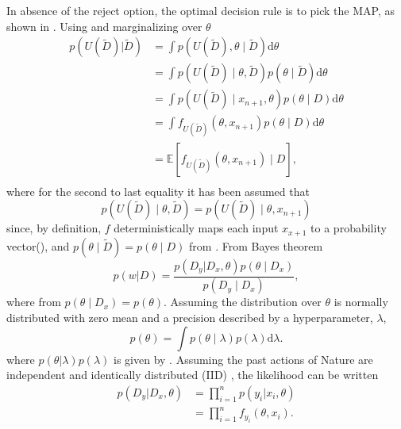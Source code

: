 In absence of the reject option, the optimal decision rule is to pick the MAP, as shown in . Using  and marginalizing over $\theta$
\begin{equation}
	\begin{split}
		p(U(\tilde{D})|\tilde{D}) &= \int p(U(\tilde{D}),\theta \mid\tilde{D}) \mathrm{d}\theta \\
		& = \int p(U(\tilde{D})\mid \theta,\tilde{D})  p(\theta \mid\tilde{D})\mathrm{d}\theta \\
		& = \int p(U(\tilde{D})\mid x_{n+1},\theta)  p(\theta\mid D)\mathrm{d}\theta \\
		& = \int f_{U(\tilde{D})}(\theta,x_{n+1})  p(\theta \mid D)\mathrm{d}\theta \\
		& = \mathbb{E}[f_{U(\tilde{D})}(\theta,x_{n+1})\mid D],\\
	\end{split}
	\label{eq:q5}
\end{equation}
where for the second to last equality it has been assumed that
\begin{equation}
	p(U(\tilde{D})\mid \theta,\tilde{D}) = p(U(\tilde{D})\mid \theta,x_{n+1})
\end{equation}
since, by definition, $f$ deterministically maps each input $x_{x+1}$ to a probability vector(), and $p(\theta \mid\tilde{D}) = p(\theta \mid D)$ from . From Bayes theorem
\begin{equation}
	p(w|D) =\frac{p(D_y|D_x,\theta)p(\theta\mid D_x)}{p(D_y\mid D_x)},
\end{equation}
where from  $p(\theta\mid D_x) = p(\theta)$. Assuming the distribution over $\theta$ is normally distributed with zero mean and a precision described by a hyperparameter, $\lambda$, 
\begin{equation}
	p(\theta) = \int p(\theta\mid\lambda)p(\lambda) \mathrm{d}\lambda.
\end{equation}
where $p(\theta|\lambda)p(\lambda)$ is given by . Assuming the past actions of Nature are independent and identically distributed (IID) , the likelihood can be written~\citep{Fischer1999} 
\begin{equation}
	\begin{split}
		p(D_y|D_x,\theta) &=\prod_{i=1}^{n}p(y_i|x_i,\theta)\\
		&=\prod_{i=1}^{n}f_{y_i}(\theta,x_i).\\
	\end{split}
	\label{lik}
\end{equation}
